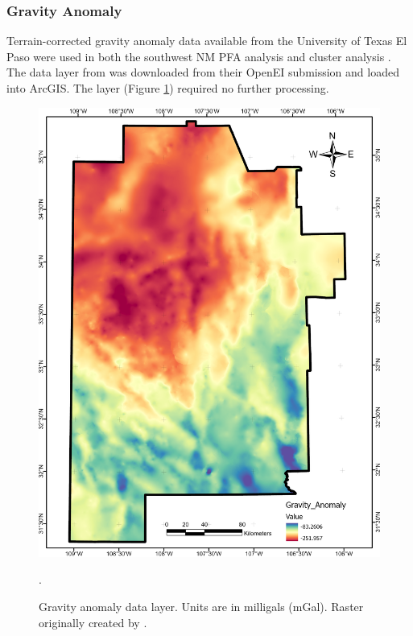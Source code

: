 \subsubsection{Gravity Anomaly}

Terrain-corrected gravity anomaly data available from the University of Texas El Paso \citep{utep_gravity_2011} were used in both the southwest NM PFA analysis \citep{bielicki_hydrogeolgic_2015} and cluster analysis \citep{pepin_new_2018}. The data layer from \citeauthor{bielicki_hydrogeolgic_2015} was downloaded from their OpenEI submission \citep{kelley_geothermal_2015} and loaded into ArcGIS. The layer (Figure \ref{fig:feat_gravity}) required no further processing.

\begin{figure}[!htp]
\centering
\includegraphics[scale=.50]{templates/images/Figure-GravityAnomaly.png}
\caption[Gravity anomaly data layer]{Gravity anomaly data layer. Units are in milligals (mGal). Raster originally created by \protect\citet{bielicki_hydrogeolgic_2015}.}.
\label{fig:feat_gravity}
\end{figure}

